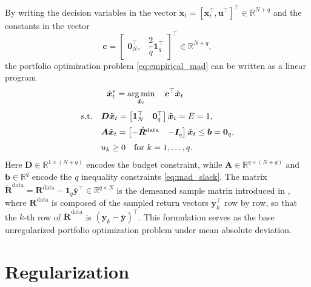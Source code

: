 By writing the decision variables in the vector
$\tilde{\bm{x}}_t = [\bm{x}_t^\top, \bm{u}^\top]^\top \in \mathbb{R}^{N+q}$ and the constants in the vector
\begin{equation*}
    \bm{c} = \begin{bmatrix} \bm{0}_N^\top, & \dfrac{2}{q} \bm{1}_q^\top \end{bmatrix}^\top \in \mathbb{R}^{N+q},
\end{equation*}
the portfolio optimization problem \eqref{eq:empirical_mad} can be written as a linear program
\begin{equation} \label{eq:mad_base_lp}
\begin{aligned}
    & \ \ \tilde{\bm{x}}_t^* = \operatorname*{arg\,min}_{\tilde{\bm{x}}_t} \quad
     \bm{c}^\top \tilde{\bm{x}}_t \\[4pt]
    \text{s.t.} \quad
    & \bm{D} \tilde{\bm{x}}_t =
    \begin{bmatrix} \bm{1}_N^\top & \bm{0}_q^\top \end{bmatrix}
    \tilde{\bm{x}}_t = E = 1, \\[2pt]
    & \bm{A} \tilde{\bm{x}}_t =
    \begin{bmatrix} -\mathring{\bm{R}}^{\text{data}} & -\bm{I}_q \end{bmatrix}
    \tilde{\bm{x}}_t \le \bm{b} = \bm{0}_q, \\[2pt]
    & u_k \ge 0 \quad \text{for } k = 1, \dots, q.
\end{aligned}
\end{equation}
Here $\bm{D} \in \mathbb{R}^{1 \times (N+q)}$ encodes the budget constraint, while
$\bm{A} \in \mathbb{R}^{q \times (N+q)}$ and $\bm{b} \in \mathbb{R}^q$ encode the $q$ inequality constraints
\eqref{eq:mad_slack}. The matrix
$\mathring{\bm{R}}^{\text{data}} = \bm{R}^{\text{data}} - \bm{1}_q \bar{\bm{y}}^\top \in \mathbb{R}^{q \times N}$ is the
demeaned sample matrix introduced in , where $\bm{R}^{\text{data}}$ is composed of the sampled
return vectors $\bm{y}_k^\top$ row by row, so that the $k$-th row of $\mathring{\bm{R}}^{\text{data}}$ is
$(\bm{y}_k - \bar{\bm{y}})^\top$. This formulation serves as the base unregularized portfolio optimization problem under
mean absolute deviation.

\section{Regularization} \label{app:mad_regularization}

